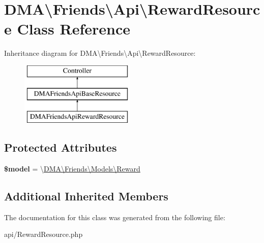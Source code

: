 \hypertarget{classDMA_1_1Friends_1_1Api_1_1RewardResource}{}\section{D\+M\+A\textbackslash{}Friends\textbackslash{}Api\textbackslash{}Reward\+Resource Class Reference}
\label{classDMA_1_1Friends_1_1Api_1_1RewardResource}
Inheritance diagram for D\+M\+A\textbackslash{}Friends\textbackslash{}Api\textbackslash{}Reward\+Resource\+:\begin{figure}[H]
\begin{center}
\leavevmode
\includegraphics[height=3.000000cm]{d2/d30/classDMA_1_1Friends_1_1Api_1_1RewardResource}
\end{center}
\end{figure}
\subsection*{Protected Attributes}
\begin{DoxyCompactItemize}
\item 
\hypertarget{classDMA_1_1Friends_1_1Api_1_1RewardResource_a60661c07e9263496284122d8cd568f91}{}{\bfseries \$model} = \textquotesingle{}\textbackslash{}\hyperlink{classDMA_1_1Friends_1_1Models_1_1Reward}{D\+M\+A\textbackslash{}\+Friends\textbackslash{}\+Models\textbackslash{}\+Reward}\textquotesingle{}\label{classDMA_1_1Friends_1_1Api_1_1RewardResource_a60661c07e9263496284122d8cd568f91}

\end{DoxyCompactItemize}
\subsection*{Additional Inherited Members}


The documentation for this class was generated from the following file\+:\begin{DoxyCompactItemize}
\item 
api/Reward\+Resource.\+php\end{DoxyCompactItemize}
